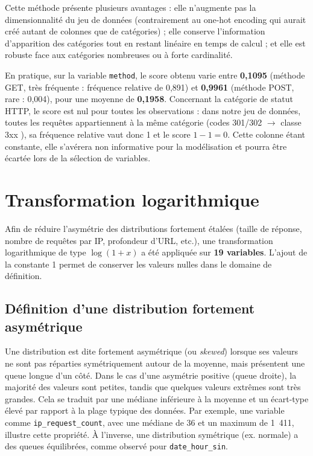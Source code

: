 \documentclass[a4paper,12pt]{article}
\begin{document}
Cette méthode présente plusieurs avantages : elle n'augmente pas la dimensionnalité du jeu de données (contrairement au one-hot encoding qui aurait créé autant de colonnes que de catégories) ; elle conserve l'information d'apparition des catégories tout en restant linéaire en temps de calcul ; et elle est robuste face aux catégories nombreuses ou à forte cardinalité.

En pratique, sur la variable \texttt{method}, le score obtenu varie entre \textbf{0{,}1095} (méthode GET, très fréquente : fréquence relative de 0{,}891) et \textbf{0{,}9961} (méthode POST, rare : 0{,}004), pour une moyenne de \textbf{0{,}1958}. Concernant la catégorie de statut HTTP, le score est nul pour toutes les observations : dans notre jeu de données, toutes les requêtes appartiennent à la même catégorie (codes 301/302 $\to$ classe \og 3xx \fg{}), sa fréquence relative vaut donc 1 et le score $1 - 1 = 0$. Cette colonne étant constante, elle s'avérera non informative pour la modélisation et pourra être écartée lors de la sélection de variables.

\section{Transformation logarithmique}

Afin de réduire l'asymétrie des distributions fortement étalées (taille de réponse, nombre de requêtes par IP, profondeur d'URL, etc.), une transformation logarithmique de type $\log(1 + x)$ a été appliquée sur \textbf{19 variables}. L'ajout de la constante 1 permet de conserver les valeurs nulles dans le domaine de définition.

\subsection{Définition d'une distribution fortement asymétrique}

Une distribution est dite fortement asymétrique (ou \emph{skewed}) lorsque ses valeurs ne sont pas réparties symétriquement autour de la moyenne, mais présentent une queue longue d'un côté. Dans le cas d'une asymétrie positive (queue droite), la majorité des valeurs sont petites, tandis que quelques valeurs extrêmes sont très grandes. Cela se traduit par une médiane inférieure à la moyenne et un écart-type élevé par rapport à la plage typique des données. Par exemple, une variable comme \texttt{ip\_request\_count}, avec une médiane de 36 et un maximum de 1~411, illustre cette propriété. À l'inverse, une distribution symétrique (ex. normale) a des queues équilibrées, comme observé pour \texttt{date\_hour\_sin}.
\end{document}
